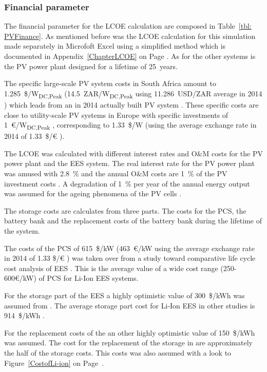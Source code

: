 \subsubsection{Financial parameter}
The financial parameter for the LCOE calculation are composed in Table~\ref{tbl: PVFinance}. As mentioned before was the LCOE calculation for this simulation made separately in Microfoft Excel using a simplified method which is documented in Appendix~\ref{ChapterLCOE} on Page \pageref{ChapterLCOE}. As for the other systems is the PV power plant designed for a lifetime of 25~years. 



The specific large-scale PV system costs in South Africa  amount to 1.285~\$/W\textsubscript{DC,Peak} (14.5~ZAR/W\textsubscript{DC,Peak} using 11.286~USD/ZAR average in 2014 \cite{IRS2015}) which leads from an in 2014 actually built PV system \cite{Terblanche2015}. These specific costs are close to utility-scale PV systems in Europe with specific investments of 1~€/W\textsubscript{DC,Peak} \cite{FraunhoferISE2013}, corresponding to 1.33~\$/W (using the average exchange rate in 2014 of 1.33~\$/€ \cite{StatistaGmbH2015}).

The LCOE was calculated with different interest rates and O\&M costs for the PV power plant and the EES system. The real interest rate for the PV power plant was amused with 2.8~\% \cite{FraunhoferISE2013} and the annual O\&M costs are 1~\%  of the PV investment costs \cite{IEA2014a}. A degradation of 1~\% per year of the annual energy output was assumed for the ageing phenomena of the PV cells \cite{Tidball2010}.



The storage costs are calculates from three  parts. The costs for the PCS, the battery bank and the replacement costs of the battery bank during the lifetime of the system.

The costs of the PCS of 615~\$/kW (463~€/kW using the average exchange rate in 2014 of 1.33 \$/€ \cite{StatistaGmbH2015}) was taken over from a study toward comparative life cycle cost analysis of EES \cite{Zakeri2015}. This is the average value of  a wide cost range (250-600€/kW) of PCS for Li-Ion EES systems.

For the storage part of the EES a highly optimistic value of 300~\$/kWh was assumed from \cite{Nykvist2015}. The average storage part cost for Li-Ion EES in other studies is 914~\$/kWh \cite{Zakeri2015}.

For the replacement costs of the an other highly optimistic value of 150~\$/kWh was assumed. The cost for the replacement of the storage in \cite{Zakeri2015} are approximately the half of the storage costs. This costs was also assumed with a look to Figure~\ref{CostofLi-ion} on Page~\pageref{CostofLi-ion}.

